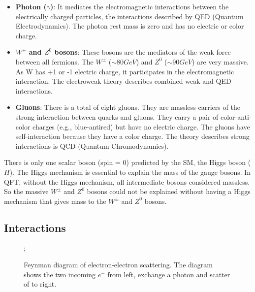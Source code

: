\begin{itemize}
\item \textbf{Photon ($\gamma$)}: It mediates the electromagnetic interactions between the electrically charged particles, the interactions described by QED (Quantum Electrodynamics). The photon rest mass is zero and has no electric or color charge.

\item \textbf{$W^{\pm}$ and $Z^{0}$ bosons}: These bosons are the mediators of the weak force between all fermions. The $W^{\pm}$ ($\sim80GeV$) and $Z^{0}$ ($\sim90GeV$) are very massive. As W has +1 or -1 electric charge, it participates in the electromagnetic interaction. The electroweak theory describes combined weak and QED interactions.

\item \textbf{Gluons}: There is a total of eight gluons. They are massless carriers of the strong interaction between quarks and gluons. They carry a pair of color-anti-color charges (e.g., blue-antired) but have no electric charge. The gluons have self-interaction because they have a color charge. The theory describes strong interactions is QCD (Quantum Chromodynamics).

\end{itemize}

There is only one scalar boson (spin = 0) predicted by the SM, the Higgs boson ($H$). The Higgs mechanism is essential to explain the mass of the gauge bosons. In QFT, without the Higgs mechanism, all intermediate bosons considered massless.  So the massive $W^{\pm}$ and $Z^{0}$ bosons could not be explained without having a Higgs mechanism that gives mass to the $W^{\pm}$ and $Z^{0}$ bosons. 

\subsection{Interactions}

\begin{figure}
\centering
{};
\decoRule
\caption{Feynman diagram of electron-electron scattering. The diagram shows the two incoming $e^{-}$ from left, exchange a photon and scatter of to right.}
\label{fig:Feynman_ee}
\end{figure}

